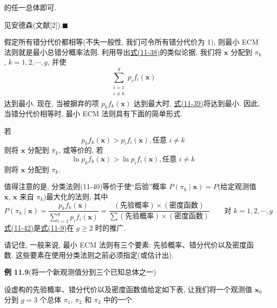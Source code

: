 
的任一总体即可.

\noindent{}\quad 见安德森(文献[2]).\hfill$\blacksquare$

假定所有错分代价都相等(不失一般性, 我们可令所有错分代价为 1), 则最小 ECM 法则就是最小总错分概率法则. 利用导出\hyperref[eq:11-38]{式(11-38)}的类似论据, 我们将 $\mathbf{x}$ 分配到 $\pi_k$, $k=1,2,\cdots,g$, 并使
\label{eq:11-39}
\begin{equation}
\sum_{\substack{i=1\\i\ne k}}^{g}p_if_i(\mathbf{x})
\tag{11-39}
\end{equation}
达到最小. 现在, 当被摒弃的项 $p_kf_k(\mathbf{x})$ 达到最大时, \hyperref[eq:11-39]{式(11-39)}将达到最小. 因此, 当错分代价相等时, 最小 ECM 法则具有下面的简单形式.

\begin{mvframe}
若
\label{eq:11-40}
\begin{equation}
p_kf_k(\mathbf{x})>p_if_i(\mathbf{x}), \text{任意 } i\ne k
\tag{11-40}
\end{equation}
则将 $\mathbf{x}$ 分配到 $\pi_k$, 或等价的, 若
\label{eq:11-41}
\begin{equation}
\ln p_kf_k(\mathbf{x})>\ln p_if_i(\mathbf{x}), \text{任意 } i\ne k
\tag{11-41}
\end{equation}
则将 $\mathbf{x}$ 分配到 $\pi_k$.
\end{mvframe}

值得注意的是, 分类法则(11-40)等价于使“后验”概率 $P(\pi_k\mid \mathbf{x})=P$(给定观测值 $\mathbf{x}$, $\mathbf{x}$ 来自 $\pi_k$)最大化的法则, 其中
\label{eq:11-42}
\begin{equation}
P(\pi_k\mid \mathbf{x})=\frac{p_kf_k(\mathbf{x})}{\sum_{i=1}^{g}p_if_i(\mathbf{x})}=\frac{(\text{先验概率})\times(\text{密度函数})}{\sum(\text{先验概率})\times(\text{密度函数})}\qquad \text{对 } k=1,2,\cdots,g
\tag{11-42}
\end{equation}
\hyperref[eq:11-42]{式(11-42)}是\hyperref[eq:11-9]{式(11-9)}在 $g\ge 2$ 时的推广.

请记住, 一般来说, 最小 ECM 法则有三个要素: 先验概率、错分代价以及密度函数. 这些要素在使用分类法则之前必须指定(或估计出).

\noindent\textbf{例 11.9}\quad (将一个新观测值分到三个已知总体之一)

设虚构的先验概率、错分代价以及密度函数值给定如下表, 让我们将一个观测值 $\mathbf{x}_0$ 分到 $g=3$ 个总体 $\pi_1$, $\pi_2$ 和 $\pi_3$ 中的一个.

